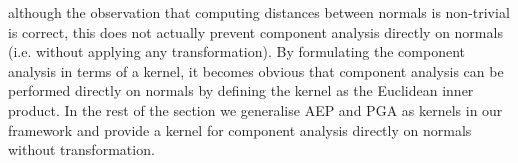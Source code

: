 although the observation that computing distances between normals is non-trivial
is correct, this does not actually prevent component analysis directly on
normals (i.e. without applying any transformation). By formulating the component
analysis in terms of a kernel, it becomes obvious that component analysis can be
performed directly on normals by defining the kernel as the Euclidean inner
product. In the rest of the section we generalise AEP and PGA as kernels in our
framework and provide a kernel for component analysis directly on normals
without transformation.


